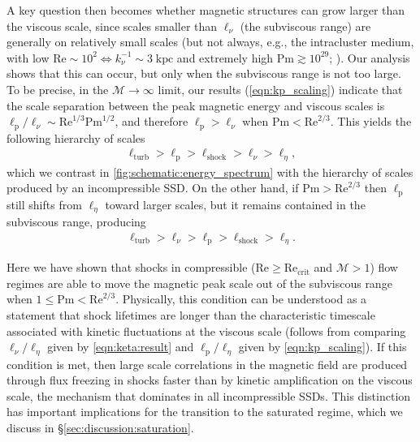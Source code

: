 \documentclass[12pt,twoside]{extreport}
\newcommand{\mReh}{\ensuremath{\mathrm{Re}}} %
\newcommand{\mPrm}{\ensuremath{\mathrm{Pm}}} %
\newcommand{\mSonicMach}{\ensuremath{\mathcal{M}}} %
\providecommand{\DIFaddbegin}{} %
\providecommand{\DIFaddend}{} %
\providecommand{\DIFdelbegin}{} %
\providecommand{\DIFdelend}{} %
\providecommand{\DIFscaledelfig}{0.5}
\newlength{\DIFdelgraphicswidth} %
\newlength{\DIFdelgraphicsheight} %
\providecommand{\DIFaddincludegraphics}[2][]{{\color{DIFgreen}\fbox{\DIFOincludegraphics[#1]{#2}}}} %
\providecommand{\DIFdelincludegraphics}[2][]{%
\sbox{\DIFdelgraphicsbox}{\DIFOincludegraphics[#1]{#2}}%
\settoboxwidth{\DIFdelgraphicswidth}{\DIFdelgraphicsbox} %
\settoboxtotalheight{\DIFdelgraphicsheight}{\DIFdelgraphicsbox} %
\scalebox{\DIFscaledelfig}{%
\parbox[b]{\DIFdelgraphicswidth}{\usebox{\DIFdelgraphicsbox}\\[-\baselineskip] \rule{\DIFdelgraphicswidth}{0em}}\llap{\resizebox{\DIFdelgraphicswidth}{\DIFdelgraphicsheight}{%
\setlength{\unitlength}{\DIFdelgraphicswidth}%
\begin{picture}(1,1)%
\thicklines\linethickness{2pt} %
{\color{DIFpurple}\put(0,0){\framebox(1,1){}}}%
{\color{DIFpurple}\put(0,0){\line( 1,1){1}}}%
{\color{DIFpurple}\put(0,1){\line(1,-1){1}}}%
\end{picture}%
}\hspace*{3pt}}} %
} %
\DeclareRobustCommand{\DIFaddbegin}{\DIFOaddbegin \let\includegraphics\DIFaddincludegraphics} %
\DeclareRobustCommand{\DIFaddend}{\DIFOaddend \let\includegraphics\DIFOincludegraphics} %
\DeclareRobustCommand{\DIFdelbegin}{\DIFOdelbegin \let\includegraphics\DIFdelincludegraphics} %
\DeclareRobustCommand{\DIFdelend}{\DIFOaddend \let\includegraphics\DIFOincludegraphics} %
\begin{document}
A key question then becomes whether magnetic structures can grow larger than the viscous scale, since scales smaller than $\ell_\nu$ (the subviscous range) are generally on relatively small scales (but not always, e.g., the intracluster medium, with low $\mReh \sim 10^2 \iff k_\nu^{-1} \sim 3\;\mathrm{kpc}$ and extremely high $\mPrm \gtrsim 10^{29}$; \citealt{Schekochihin2006_ICM,StOnge2020_weakly_collisional_dynamo}). Our analysis shows that this can occur, but only when the subviscous range is not too large. To be precise, in the $\mSonicMach \to \infty$ limit, our results (\autoref{eqn:kp_scaling}) indicate that the scale separation between the peak magnetic energy and viscous scales is $\ell_\mathrm{p}/\ell_\nu \sim \mReh^{1/3} \mPrm^{1/2}$, and therefore $\ell_\mathrm{p} > \ell_\nu$ when $\mPrm < \mReh^{2/3}$. This yields the following hierarchy of scales
\DIFdelbegin %
\DIFdelend \DIFaddbegin \begin{align}
    \ell_\mathrm{turb} > \ell_\mathrm{p} > \ell_\mathrm{shock} > \ell_\nu > \ell_\eta
    , \label{eqn:kp:supersonic}
\end{align}\DIFaddend
which we contrast in \autoref{fig:schematic:energy_spectrum} with the hierarchy of scales produced by an incompressible SSD. On the other hand, if $\mPrm > \mReh^{2/3}$ then $\ell_\mathrm{p}$ still shifts from $\ell_\eta$ toward larger scales, but it remains contained in the subviscous range, producing
\DIFdelbegin %
\DIFdelend \DIFaddbegin \begin{align}
    \ell_\mathrm{turb} > \ell_\nu > \ell_\mathrm{p} > \ell_\mathrm{shock} > \ell_\eta
    .
\end{align}\DIFaddend

Here we have shown that shocks in compressible (\mbox{$\mReh \geq \mReh_\mathrm{crit}$} and $\mSonicMach > 1$) flow regimes are able to move the magnetic peak scale out of the subviscous range when $1 \leq \mPrm < \mReh^{2/3}$. Physically, this condition can be understood as a statement that shock lifetimes are longer than the characteristic timescale associated with kinetic fluctuations at the viscous scale (follows from comparing $\ell_\nu/\ell_\eta$ given by \autoref{eqn:keta:result} and $\ell_\mathrm{p}/\ell_\eta$ given by \autoref{eqn:kp_scaling}). If this condition is met, then large scale correlations in the magnetic field are produced through flux freezing in shocks faster than by kinetic amplification on the viscous scale, the mechanism that dominates in all incompressible SSDs. This distinction has important implications for the transition to the saturated regime, which we discuss in \S\ref{sec:discussion:saturation}.
\end{document}
